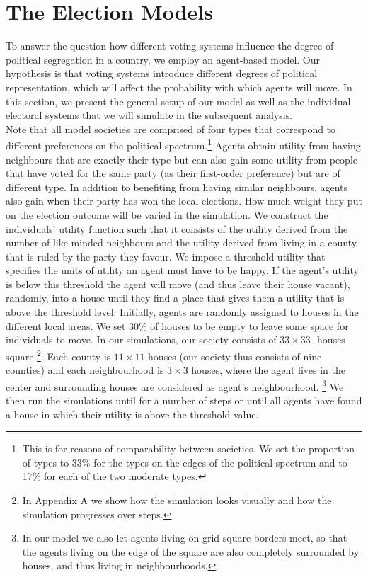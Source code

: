 \documentclass[12pt, a4paper]{article}
\begin{document}
	\section{\label{model}The Election Models}
	To answer the question how different voting systems influence the degree of political segregation in a country, we employ an agent-based model. Our hypothesis is that voting systems introduce different degrees of political representation, which will affect the probability with which agents will move. In this section, we present the general setup of our model as well as the individual electoral systems that we will simulate in the subsequent analysis.\\%
	Note that all model societies are comprised of four types that correspond to different preferences on the political spectrum.\footnote{This is for reasons of comparability between societies. We set the proportion of types to 33\% for the types on the edges of the political spectrum and to 17\% for each of the two moderate types.} Agents obtain utility from having neighbours that are exactly their type but can also gain some utility from people that have voted for the same party (as their first-order preference) but are of different type. In addition to benefiting from having similar neighbours, agents also gain when their party has won the local elections. How much weight they put on the election outcome will be varied in the simulation.
	We construct the individuals' utility function such that it consists of the utility derived from the number of like-minded neighbours and the utility derived from living in a county that is ruled by the party they favour.
	We impose a threshold utility that specifies the units of utility an agent must have to be happy. If the agent's utility is below this threshold the agent will move (and thus leave their house vacant), randomly, into a house until they find a place that gives them a utility that is above the threshold level. Initially, agents are randomly assigned to houses in the different local areas. We set 30\% of houses to be empty to leave some space for individuals to move.
	In our simulations, our society consists of $33\times33$ -houses square \footnote{In Appendix A we show how the simulation looks visually and how the simulation progresses over steps.}. Each county is $11\times11$ houses (our society thus consists of nine counties) and each neighbourhood is $3\times3$ houses, where the agent lives in the center and surrounding houses are considered as agent's neighbourhood. \footnote{In our model we also let agents living on grid square borders meet, so that the agents living on the edge of the square are also completely surrounded by houses, and thus living in neighbourhoods.}
	We then run the simulations until for a number of steps or until all agents have found a house in which their utility is above the threshold value.
	
\end{document}
